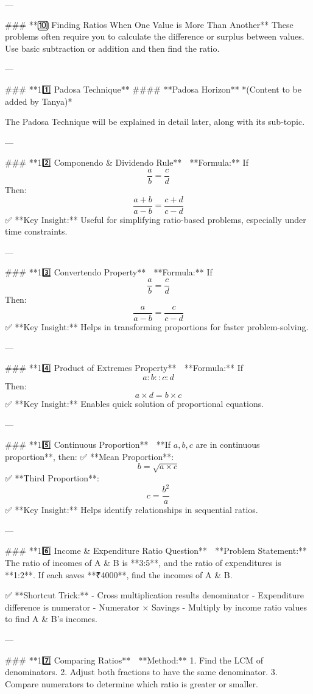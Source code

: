 ---

### **🔟 Finding Ratios When One Value is More Than Another**  
These problems often require you to calculate the difference or surplus between values. Use basic subtraction or addition and then find the ratio.

---

### **11️⃣ Padosa Technique**  
#### **Padosa Horizon** *(Content to be added by Tanya)*  

The Padosa Technique will be explained in detail later, along with its sub-topic.

---

### **12️⃣ Componendo & Dividendo Rule**  
📌 **Formula:**  
If  
\[
\frac{a}{b} = \frac{c}{d}
\]  
Then:  
\[
\frac{a + b}{a - b} = \frac{c + d}{c - d}
\]  
✅ **Key Insight:** Useful for simplifying ratio-based problems, especially under time constraints.

---

### **13️⃣ Convertendo Property**  
📌 **Formula:**  
If  
\[
\frac{a}{b} = \frac{c}{d}
\]  
Then:  
\[
\frac{a}{a - b} = \frac{c}{c - d}
\]  
✅ **Key Insight:** Helps in transforming proportions for faster problem-solving.

---

### **14️⃣ Product of Extremes Property**  
📌 **Formula:**  
If  
\[
a : b :: c : d
\]  
Then:  
\[
a \times d = b \times c
\]  
✅ **Key Insight:** Enables quick solution of proportional equations.

---

### **15️⃣ Continuous Proportion**  
📌 **If \( a, b, c \) are in continuous proportion**, then:  
✅ **Mean Proportion**:  
\[
b = \sqrt{a \times c}
\]  
✅ **Third Proportion**:  
\[
c = \frac{b^2}{a}
\]  
✅ **Key Insight:** Helps identify relationships in sequential ratios.

---

### **16️⃣ Income & Expenditure Ratio Question**  
📌 **Problem Statement:**  
The ratio of incomes of A & B is **3:5**, and the ratio of expenditures is **1:2**. If each saves **₹4000**, find the incomes of A & B.  

✅ **Shortcut Trick:**  
- Cross multiplication results denominator  
- Expenditure difference is numerator  
- Numerator × Savings  
- Multiply by income ratio values to find A & B’s incomes.

---

### **17️⃣ Comparing Ratios**  
📌 **Method:**  
1. Find the LCM of denominators.  
2. Adjust both fractions to have the same denominator.  
3. Compare numerators to determine which ratio is greater or smaller.

